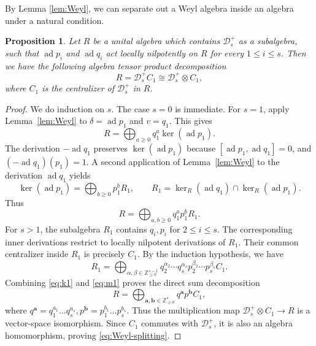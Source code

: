 \documentclass[12pt,a4paper]{amsart}
\numberwithin{equation}{section}
\newtheorem{proposition}[theorem]{Proposition}
\theoremstyle{definition}
\theoremstyle{remark}
\newcommand{\D}{\mathcal D}
\newcommand{\ad}{\operatorname{ad}}
\newcommand{\ba}{\mathbf{a}}
\newcommand{\bb}{\mathbf{b}}
\begin{document}
By Lemma \ref{lem:Weyl}, we can separate out a Weyl algebra inside an algebra under a natural condition.


\begin{proposition}
\label{lem:finite-separation}
Let $R$ be a unital algebra which contains $\D^+_s$ as a subalgebra,  such that
$\operatorname{ad}p_i$ and
$\operatorname{ad}q_i$
act locally nilpotently on $R$ for every $1\leq i \leq s$.
Then
 we have the following algebra  tensor product decomposition
\begin{equation}\label{eq:Weyl-splitting}R=\D^+_sC_1 \cong \D^+_s\otimes C_1,\end{equation}
where $C_1$ is the centralizer of $\D^+_s$ in $R$.
\end{proposition}

\begin{proof}
We do induction on $s$. The case $s=0$ is immediate. For $s=1$, apply Lemma~\ref{lem:Weyl}
to $\delta=\ad p_1$ and $v=q_1$. This gives
\[
 R=\bigoplus_{a\geq0}q_1^a\ker(\ad p_1).
\]
The derivation $-\ad q_1$ preserves $\ker(\ad p_1)$ because
$[\ad p_1,\ad q_1]=0$, and $(-\ad q_1)(p_1)=1$.
A second application of Lemma~\ref{lem:Weyl} to
the derivation $\ad q_1$ yields
$$\ker(\ad p_1)=\bigoplus_{b\geq0}p_1^b R_1,\qquad
 R_1=\ker_R(\ad q_1)\cap\ker_R(\ad p_1).$$
Thus \begin{equation}\label{eq:k1}
 R=\bigoplus_{a,b\geq0}q_1^ap_1^b R_1.
\end{equation}
For $s>1$, the subalgebra $R_1$ contains $q_i,p_i$ for $2\leq i\leq s$.
The corresponding inner derivations restrict to locally nilpotent
derivations of $R_1$. Their common centralizer inside $R_1$ is precisely
$C_1$. By the induction hypothesis, we have
\begin{equation}\label{eq:m1}
 R_1=\bigoplus_{\alpha,\beta\in\mathbb Z_{\geq0}^{s-1}}
        q_2^{\alpha_2}\cdots q_s^{\alpha_s}
        p_2^{\beta_2}\cdots p_s^{\beta_s}C_1.
\end{equation}
Combining \eqref{eq:k1} and \eqref{eq:m1} proves the direct sum decomposition
\[
 R=\bigoplus_{\ba,\bb\in\mathbb Z_{\geq0}^{s}}
        q^\ba p^\bb C_1,
\]
where $q^{\ba}=q_1^{a_1}\dots q_s^{a_s}, p^{\bb}=p_1^{b_1}\dots p_s^{b_s}$. Thus the multiplication map $\D_s^+\otimes C_1\rightarrow R$ is a vector-space
isomorphism. Since $C_1$ commutes with $\D_s^+$, it is also an algebra
homomorphism, proving \eqref{eq:Weyl-splitting}.
\end{proof}
\end{document}
